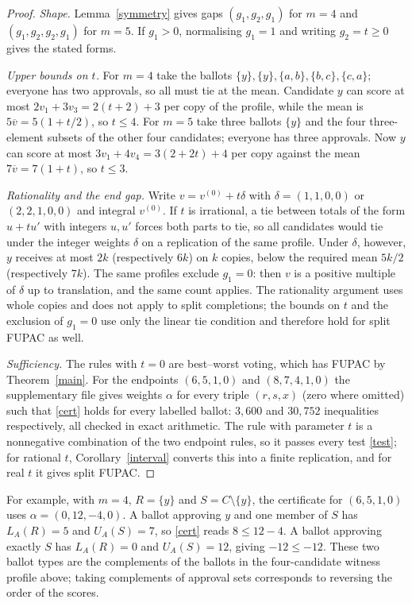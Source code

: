 \documentclass[11pt,a4paper]{article}
\theoremstyle{definition}
\theoremstyle{remark}
\begin{document}
\begin{proof}
\emph{Shape.} Lemma~\ref{symmetry} gives gaps $(g_1,g_2,g_1)$ for $m=4$ and $(g_1,g_2,g_2,g_1)$ for $m=5$. If $g_1>0$, normalising $g_1=1$ and writing $g_2=t\ge0$ gives the stated forms.

\emph{Upper bounds on $t$.} For $m=4$ take the ballots $\{y\},\{y\},\{a,b\},\{b,c\},\{c,a\}$; everyone has two approvals, so all must tie at the mean. Candidate $y$ can score at most $2v_1+3v_3=2(t+2)+3$ per copy of the profile, while the mean is $5\overline v=5(1+t/2)$, so $t\le4$. For $m=5$ take three ballots $\{y\}$ and the four three-element subsets of the other four candidates; everyone has three approvals. Now $y$ can score at most $3v_1+4v_4=3(2+2t)+4$ per copy against the mean $7\overline v=7(1+t)$, so $t\le3$.

\emph{Rationality and the end gap.} Write $v=v^{(0)}+t\delta$ with $\delta=(1,1,0,0)$ or $(2,2,1,0,0)$ and integral $v^{(0)}$. If $t$ is irrational, a tie between totals of the form $u+tu'$ with integers $u,u'$ forces both parts to tie, so all candidates would tie under the integer weights $\delta$ on a replication of the same profile. Under $\delta$, however, $y$ receives at most $2k$ (respectively $6k$) on $k$ copies, below the required mean $5k/2$ (respectively $7k$). The same profiles exclude $g_1=0$: then $v$ is a positive multiple of $\delta$ up to translation, and the same count applies. The rationality argument uses whole copies and does not apply to split completions; the bounds on $t$ and the exclusion of $g_1=0$ use only the linear tie condition and therefore hold for split FUPAC as well.

\emph{Sufficiency.} The rules with $t=0$ are best--worst voting, which has FUPAC by Theorem~\ref{main}. For the endpoints $(6,5,1,0)$ and $(8,7,4,1,0)$ the supplementary file gives weights $\alpha$ for every triple $(r,s,x)$ (zero where omitted) such that \eqref{cert} holds for every labelled ballot: $3{,}600$ and $30{,}752$ inequalities respectively, all checked in exact arithmetic. The rule with parameter $t$ is a nonnegative combination of the two endpoint rules, so it passes every test \eqref{test}; for rational $t$, Corollary~\ref{interval} converts this into a finite replication, and for real $t$ it gives split FUPAC.
\end{proof}

For example, with $m=4$, $R=\{y\}$ and $S=C\setminus\{y\}$, the certificate for $(6,5,1,0)$ uses $\alpha=(0,12,-4,0)$. A ballot approving $y$ and one member of $S$ has $L_A(R)=5$ and $U_A(S)=7$, so \eqref{cert} reads $8\le12-4$. A ballot approving exactly $S$ has $L_A(R)=0$ and $U_A(S)=12$, giving $-12\le-12$. These two ballot types are the complements of the ballots in the four-candidate witness profile above; taking complements of approval sets corresponds to reversing the order of the scores.
\end{document}
